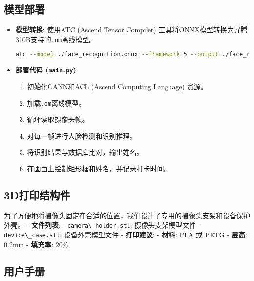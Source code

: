 \subsection{模型部署}\label{ux6a21ux578bux90e8ux7f72}

\begin{itemize}
\item
  \textbf{模型转换}: 使用ATC (Ascend Tensor Compiler)
  工具将ONNX模型转换为昇腾310B支持的\passthrough{\lstinline!.om!}离线模型。

\begin{lstlisting}[language=bash]
atc --model=./face_recognition.onnx --framework=5 --output=./face_recognition --input_format=NCHW --input_shape="data:1,3,112,112" --soc_version=Ascend310B1
\end{lstlisting}
\item
  \textbf{部署代码 (\passthrough{\lstinline!main.py!})}:

  \begin{enumerate}
  \def\labelenumi{\arabic{enumi}.}
  \tightlist
  \item
    初始化CANN和ACL (Ascend Computing Language) 资源。
  \item
    加载\passthrough{\lstinline!.om!}离线模型。
  \item
    循环读取摄像头帧。
  \item
    对每一帧进行人脸检测和识别推理。
  \item
    将识别结果与数据库比对，输出姓名。
  \item
    在画面上绘制矩形框和姓名，并记录打卡时间。
  \end{enumerate}
\end{itemize}

\subsection{3D打印结构件}\label{dux6253ux5370ux7ed3ux6784ux4ef6}

为了方便地将摄像头固定在合适的位置，我们设计了专用的摄像头支架和设备保护外壳。
- \textbf{文件列表}: - \passthrough{\lstinline!camera\_holder.stl!}:
摄像头支架模型文件 - \passthrough{\lstinline!device\_case.stl!}:
设备外壳模型文件 - \textbf{打印建议}: - \textbf{材料}: PLA 或 PETG -
\textbf{层高}: 0.2mm - \textbf{填充率}: 20\%

\subsection{用户手册}\label{ux7528ux6237ux624bux518c}

